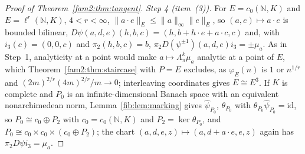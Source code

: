 \documentclass[11pt]{amsart}
\theoremstyle{definition}
\theoremstyle{remark}
\numberwithin{equation}{section}
\newcommand{\N}{\mathbb N}
\newcommand{\id}{\mathrm{id}}
\newcommand{\norm}[1]{\lVert #1\rVert}
\theoremstyle{plain}
\theoremstyle{definition}
\theoremstyle{plain}
\begin{document}
\begin{proof}[Proof of Theorem~\ref{fam2:thm:tangent}]
\emph{Step 4 (item~(3)).} For $E=c_0(\N,K)$ and $E=\ell^r(\N,K)$, $4<r<\infty$, $\norm{a\cdot e}_E\le\norm a_\infty\norm e_E$,
so $(a,e)\mapsto a\cdot e$ is bounded bilinear, $D\psi(a,d,e)(h,b,c)=(h,b+h\cdot e+a\cdot c,c)$ and, with $i_3(c)=(0,0,c)$
and $\pi_2(h,b,c)=b$, $\pi_2D(\psi^{\pm1})(a,d,e)i_3=\pm\mu_a$. As in Step~1, analyticity at a point would make
$a\mapsto\Lambda^k_\pi\mu_a$ analytic at a point of $E$, which Theorem~\ref{fam2:thm:staircase} with $P=E$ excludes, as
$\varphi_E(n)$ is $1$ or $n^{1/r}$ and $(2m)^{2/r}(4m)^{2/r}/m\to0$; interleaving coordinates gives $E\cong E^3$. If $K$ is
complete and $P_0$ is an infinite-dimensional Banach space with an equivalent nonarchimedean norm, Lemma~\ref{fib:lem:marking}
gives $\widehat\psi_{P_0}$, $\theta_{P_0}$ with $\theta_{P_0}\widehat\psi_{P_0}=\id$, so $P_0\cong c_0\oplus P_2$ with
$c_0=c_0(\N,K)$ and $P_2=\ker\theta_{P_0}$, and $P_0\cong c_0\times c_0\times(c_0\oplus P_2)$; the chart
$(a,d,e,z)\mapsto(a,d+a\cdot e,e,z)$ again has $\pi_2D\psi i_3=\mu_a$.
\end{proof}
\end{document}
